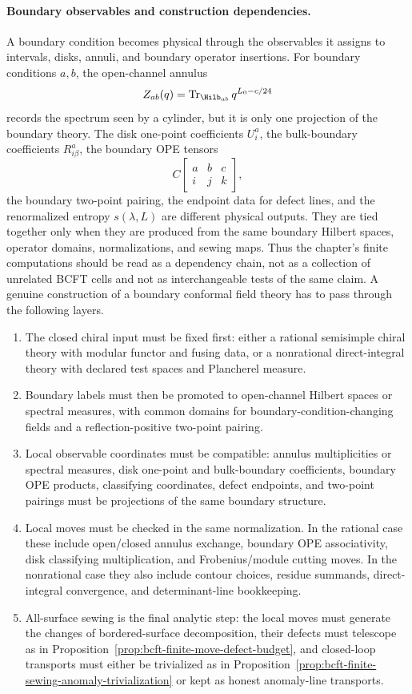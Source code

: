 \paragraph{Boundary observables and construction dependencies.}
A boundary condition becomes physical through the observables it assigns to
intervals, disks, annuli, and boundary operator insertions.  For boundary
conditions \(a,b\), the open-channel annulus
\[
  Z_{ab}(q)
  =
  \operatorname{Tr}_{\Hilb_{ab}}
  q^{L_0-c/24}
\]
records the spectrum seen by a cylinder, but it is only one projection of the
boundary theory.  The disk one-point coefficients \(U^a_i\), the
bulk-boundary coefficients \(R^a_{i\beta}\), the boundary OPE tensors
\[
  C\!\begin{bmatrix} a&b&c\\ i&j&k \end{bmatrix},
\]
the boundary two-point pairing, the endpoint data for defect lines, and the
renormalized entropy \(s(\lambda,L)\) are different physical outputs.  They
are tied together only when they are produced from the same boundary Hilbert
spaces, operator domains, normalizations, and sewing maps.  Thus the chapter's
finite computations should be read as a dependency chain, not as a collection
of unrelated BCFT cells and not as interchangeable tests of the same claim.
A genuine construction of a boundary conformal field theory has to pass
through the following layers.
\begin{enumerate}
  \item The closed chiral input must be fixed first: either a rational
  semisimple chiral theory with modular functor and fusing data, or a
  nonrational direct-integral theory with declared test spaces and
  Plancherel measure.
  \item Boundary labels must then be promoted to open-channel Hilbert spaces
  or spectral measures, with common domains for boundary-condition-changing
  fields and a reflection-positive two-point pairing.
  \item Local observable coordinates must be compatible: annulus
  multiplicities or spectral measures, disk one-point and bulk-boundary
  coefficients, boundary OPE products, classifying coordinates, defect
  endpoints, and two-point pairings must be projections of the same boundary
  structure.
  \item Local moves must be checked in the same normalization.  In the
  rational case these include open/closed annulus exchange, boundary OPE
  associativity, disk classifying multiplication, and Frobenius/module
  cutting moves.  In the nonrational case they also include contour choices,
  residue summands, direct-integral convergence, and determinant-line
  bookkeeping.
  \item All-surface sewing is the final analytic step: the local moves must
  generate the changes of bordered-surface decomposition, their defects must
  telescope as in
  Proposition~\ref{prop:bcft-finite-move-defect-budget}, and closed-loop
  transports must either be trivialized as in
  Proposition~\ref{prop:bcft-finite-sewing-anomaly-trivialization} or kept as
  honest anomaly-line transports.
\end{enumerate}
